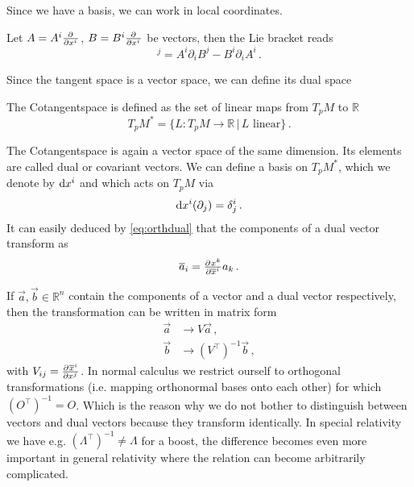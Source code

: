 Since we have a basis, we can work in local coordinates.
\begin{example}
Let $A=A^i\pd{}{{x^i}}$, $B=B^i\pd{}{{x^i}}$ be vectors, then the Lie bracket
reads
\begin{equation}
    [A,B]^j=A^i\partial_iB^j-B^i\partial_iA^i\, .
\end{equation}
\end{example}
Since the tangent space is a vector space, we can define its dual space
\begin{definition}[Cotangentspace] The Cotangentspace is defined as the set of
linear maps from $T_pM$ to $\mathbb{R}$
\begin{equation}
    T_pM^*=\{L:T_pM\to \mathbb{R}\, |\, L \text{ linear}\}\, .
\end{equation}
\end{definition}
The Cotangentspace is again a vector space of the same dimension. Its elements
are called dual or covariant vectors.
We can define a basis on $	T_pM^*$, which we denote by $\dif x^i$ and  which acts on $T_pM$ via
\begin{equation}
    \dif x^i(\partial_j)=\delta^i_j\, . \label{eq:orthdual}
\end{equation}
It can easily deduced by \eqref{eq:orthdual} that the components of a dual vector transform as
\begin{equation}
    \overline{a}_i=\pd{x^k}{{\overline{x}^i}}a_k\, .
\end{equation}
\begin{remark}
If $\vec{a},\vec{b}\in\mathbb{R}^n$ contain the components of a vector and a
dual vector respectively, then the transformation can be written in matrix form
\begin{align}
    \vec{a}&\to V\vec{a}\, ,\\
    \vec{b}&\to\left(V^\intercal\right)^{-1}\vec{b}\, ,
\end{align}
with $V_{ij}=\pd{\overline{x}^i}{{x^j}}$. 
In normal calculus we restrict ourself to orthogonal transformations (i.e.
mapping orthonormal bases onto each other) for which $(O^\intercal)^{-1}=O$.
Which is the reason why we do not bother to distinguish between vectors and dual vectors because they transform identically. 
In special relativity we have e.g. $(\Lambda^\intercal)^{-1}\neq\Lambda$ for a
boost, the difference becomes even more important in general relativity where the relation can become arbitrarily complicated.
\end{remark}
